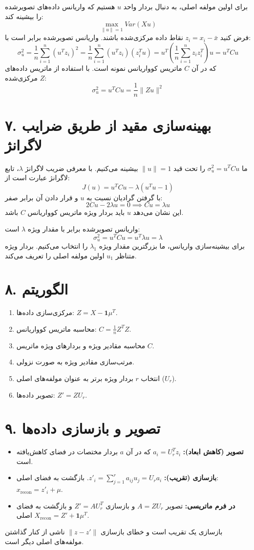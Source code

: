 \documentclass{article}
\begin{document}
برای اولین مولفه اصلی، به دنبال بردار واحد $u$ هستیم که واریانس داده‌های تصویرشده را بیشینه کند:
\[
\max_{\|u\|=1} Var(X u)
\]
فرض کنید $z_i = x_i - \bar{x}$ نقاط داده مرکزی‌شده باشند. واریانس تصویرشده برابر است با:
\[
\sigma^2_u = \frac{1}{n} \sum_{i=1}^n (u^T z_i)^2 = \frac{1}{n} \sum_{i=1}^n (u^T z_i)(z_i^T u) = u^T \left( \frac{1}{n} \sum_{i=1}^n z_i z_i^T \right) u = u^T C u
\]
که در آن $C$ ماتریس کوواریانس نمونه است. با استفاده از ماتریس داده‌های مرکزی‌شده $Z$:
\[
\sigma^2_u = u^T C u = \frac{1}{n} \|Z u\|^2
\]

\section*{۷. بهینه‌سازی مقید از طریق ضرایب لاگرانژ}
ما $\sigma^2_u = u^T C u$ را تحت قید $\|u\|=1$ بیشینه می‌کنیم. با معرفی ضریب لاگرانژ $\lambda$، تابع لاگرانژ عبارت است از:
\[
J(u) = u^T C u - \lambda(u^T u - 1)
\]
با گرفتن گرادیان نسبت به $u$ و قرار دادن آن برابر صفر:
\[
2 C u - 2 \lambda u = 0 \implies C u = \lambda u
\]
این نشان می‌دهد $u$ باید بردار ویژه ماتریس کوواریانس $C$ باشد.

واریانس تصویرشده برابر با مقدار ویژه $\lambda$ است:
\[
\sigma^2_u = u^T C u = u^T \lambda u = \lambda
\]
برای بیشینه‌سازی واریانس، ما بزرگترین مقدار ویژه $\lambda_1$ را انتخاب می‌کنیم. بردار ویژه متناظر $u_1$ اولین مولفه اصلی را تعریف می‌کند.

\section*{۸. الگوریتم }
\begin{enumerate}
    \item مرکزی‌سازی داده‌ها: $Z = X - \mathbf{1}\mu^T$.
    \item محاسبه ماتریس کوواریانس: $C = \frac{1}{n} Z^T Z$.
    \item محاسبه مقادیر ویژه و بردارهای ویژه ماتریس $C$.
    \item مرتب‌سازی مقادیر ویژه به صورت نزولی.
    \item انتخاب $r$ بردار ویژه برتر به عنوان مولفه‌های اصلی ($U_r$).
    \item تصویر داده‌ها: $Z' = Z U_r$.
\end{enumerate}

\section*{۹. تصویر و بازسازی داده‌ها}
\begin{itemize}
    \item \textbf{تصویر (کاهش ابعاد):} $a_i = U_r^T z_i$ که در آن $a$ بردار مختصات در فضای کاهش‌یافته است.
    \item \textbf{بازسازی (تقریب):} $z'_i = \sum_{j=1}^r a_{ij} u_j = U_r a_i$. بازگشت به فضای اصلی: $x_{\text{recon}} = z'_i + \mu$.
    \item \textbf{در فرم ماتریسی:} تصویر $A = Z U_r$ و بازسازی $Z' = A U_r^T$ و بازگشت به فضای اصلی $X_{\text{recon}} = Z' + \mathbf{1} \mu^T$.
\end{itemize}
بازسازی یک تقریب است و خطای بازسازی $\|z - z'\|$ ناشی از کنار گذاشتن مولفه‌های اصلی دیگر است.
\end{document}
